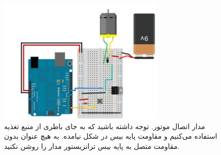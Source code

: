 \newline
\begin{figure}[h]
    \centering
    \includegraphics[width=8cm]{l5-c2.png}
    \caption{مدار اتصال موتور. توجه داشته باشید که به جای باطری از منبع تغذیه استفاده می‌کنیم و مقاومت پایه‌ بیس در شکل نیامده. به هیچ عنوان بدون مقاومت متصل به پایه بیس ترانزیستور مدار را روشن نکنید.}
    \label{fig:l5-c2}
\end{figure}
\newline